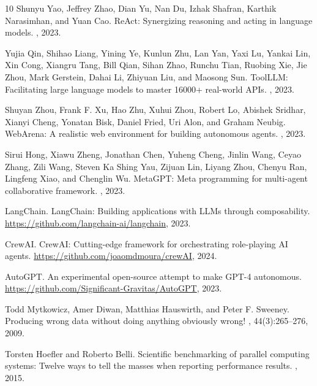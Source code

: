 \documentclass[sigconf,nonacm]{acmart}
\begin{document}
\begin{thebibliography}{10}
Shunyu Yao, Jeffrey Zhao, Dian Yu, Nan Du, Izhak Shafran, Karthik Narasimhan, and Yuan Cao.
\newblock ReAct: Synergizing reasoning and acting in language models.
, 2023.

Yujia Qin, Shihao Liang, Yining Ye, Kunlun Zhu, Lan Yan, Yaxi Lu, Yankai Lin, Xin Cong, Xiangru Tang, Bill Qian, Sihan Zhao, Runchu Tian, Ruobing Xie, Jie Zhou, Mark Gerstein, Dahai Li, Zhiyuan Liu, and Maosong Sun.
\newblock ToolLLM: Facilitating large language models to master 16000+ real-world APIs.
, 2023.

Shuyan Zhou, Frank F. Xu, Hao Zhu, Xuhui Zhou, Robert Lo, Abishek Sridhar, Xianyi Cheng, Yonatan Bisk, Daniel Fried, Uri Alon, and Graham Neubig.
\newblock WebArena: A realistic web environment for building autonomous agents.
, 2023.

Sirui Hong, Xiawu Zheng, Jonathan Chen, Yuheng Cheng, Jinlin Wang, Ceyao Zhang, Zili Wang, Steven Ka Shing Yau, Zijuan Lin, Liyang Zhou, Chenyu Ran, Lingfeng Xiao, and Chenglin Wu.
\newblock MetaGPT: Meta programming for multi-agent collaborative framework.
, 2023.

LangChain.
\newblock LangChain: Building applications with LLMs through composability.
\newblock \url{https://github.com/langchain-ai/langchain}, 2023.

CrewAI.
\newblock CrewAI: Cutting-edge framework for orchestrating role-playing AI agents.
\newblock \url{https://github.com/joaomdmoura/crewAI}, 2024.

AutoGPT.
\newblock An experimental open-source attempt to make GPT-4 autonomous.
\newblock \url{https://github.com/Significant-Gravitas/AutoGPT}, 2023.

Todd Mytkowicz, Amer Diwan, Matthias Hauswirth, and Peter F. Sweeney.
\newblock Producing wrong data without doing anything obviously wrong!
, 44(3):265--276, 2009.

Torsten Hoefler and Roberto Belli.
\newblock Scientific benchmarking of parallel computing systems: Twelve ways to tell the masses when reporting performance results.
, 2015.


\end{thebibliography}
\end{document}
